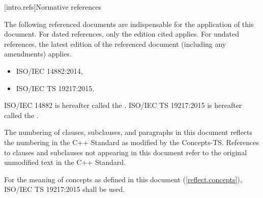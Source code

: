 
[intro.refs]{Normative references}

\pnum
The following referenced documents are indispensable for the application of this
document. For dated references, only the edition cited applies. For undated
references, the latest edition of the referenced document (including any
amendments) applies.

\begin{itemize}
\item ISO/IEC 14882:2014, 
\item ISO/IEC TS 19217:2015, 
\end{itemize}

\pnum
ISO/IEC 14882 is hereafter called the . ISO/IEC TS 19217:2015 is hereafter called the .


\pnum
The numbering of clauses, subclauses, and paragraphs in this document reflects
the numbering in the C++ Standard as modified by the Concepts-TS.  References to clauses and subclauses not
appearing in this document refer to the original unmodified text
in the C++ Standard.

\pnum
For the meaning of concepts as defined in this document (\ref{reflect.concepts}), ISO/IEC TS 19217:2015 shall be used.
